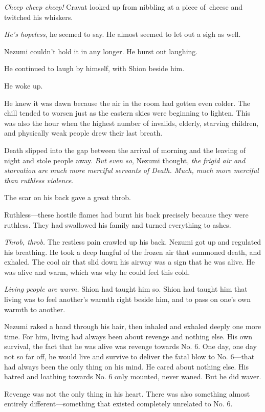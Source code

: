 \emph{Cheep cheep cheep!} Cravat looked up from nibbling at a piece of~cheese
and twitched his whiskers.

\emph{He's hopeless}, he seemed to say. He almost seemed to let out a sigh as
well.

Nezumi couldn't hold it in any longer. He burst out laughing.

He continued to laugh by himself, with Shion beside him.

\myspace

He woke up.

He knew it was dawn because the air in the room had gotten even colder.
The chill tended to worsen just as the eastern skies were beginning to
lighten. This was also the hour when the highest number of invalids,
elderly, starving children, and physically weak people drew their last
breath.

Death slipped into the gap between the arrival of morning and the
leaving of night and stole people away. \emph{But even so}, Nezumi thought, \emph{the
frigid air and starvation are much more merciful servants of Death.
Much, much more merciful than ruthless violence.}

The scar on his back gave a great throb.

Ruthless---these hostile flames had burnt his back precisely because they
were ruthless. They had swallowed his family and turned everything to
ashes.

\emph{Throb, throb.} The restless pain crawled up his back. Nezumi got up and
regulated his breathing. He took a deep lungful of the frozen air that
summoned death, and exhaled. The cool air that slid down his airway was
a sign that he was alive. He was alive and warm, which was why he could
feel this cold.

\emph{Living people are warm.} Shion had taught him so. Shion had taught him
that living was to feel another's warmth right beside him, and to pass
on one's own warmth to another.

Nezumi raked a hand through his hair, then inhaled and exhaled deeply
one more time. For him, living had always been about revenge and nothing
else. His own survival, the fact that he was alive was revenge towards
No. 6. One day, one day not so far off, he would live and survive to
deliver the fatal blow to No. 6---that had always been the only thing on
his mind. He cared about nothing else. His hatred and loathing towards
No. 6 only mounted, never waned. But he did waver.

Revenge was not the only thing in his heart. There was also something
almost entirely different---something that existed completely unrelated to
No. 6.

